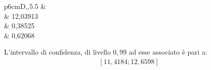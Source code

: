 \begin{savenotes}
\begin{table}[htb]
\centering
 \caption{Grandezze}
 \begin{tabular}{p{6cm}D{,}{,}{5.5}}
 \toprule
 	 &  \\
 \midrule 		
	 & 12,03913\\
 	 & 0,38525\\
 	 & 0,62068\\	
 \bottomrule
 \end{tabular} 
 \label{table:numero_medio_malattia}
\end{table}
\end{savenotes} 

L'intervallo di confidenza, di livello $0,99$ ad esse associato è pari a:
\begin{equation}
	\label{eq:intervallo_confidenza_num_malattia}
	\begin{split}
		\left [ 11,4184 ; 12,6598 \right]	 
	\end{split}
\end{equation}
